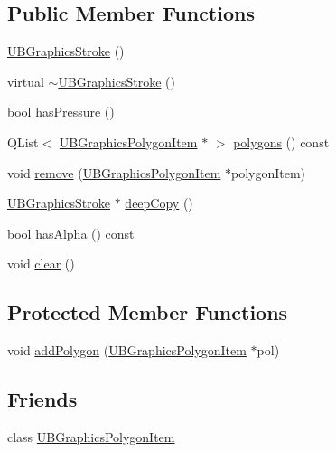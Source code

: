 \subsection*{Public Member Functions}
\begin{DoxyCompactItemize}
\item 
\hyperlink{class_u_b_graphics_stroke_a6b553a3cafb85f50607229b5430f9316}{U\-B\-Graphics\-Stroke} ()
\item 
virtual \hyperlink{class_u_b_graphics_stroke_a257f5699f73d7a5fdc6a92ae0bea4071}{$\sim$\-U\-B\-Graphics\-Stroke} ()
\item 
bool \hyperlink{class_u_b_graphics_stroke_a391767e8456dbee54956d48709dccf70}{has\-Pressure} ()
\item 
Q\-List$<$ \hyperlink{class_u_b_graphics_polygon_item}{U\-B\-Graphics\-Polygon\-Item} $\ast$ $>$ \hyperlink{class_u_b_graphics_stroke_a19d0be99f5ef2ac596e13ef018ec1d77}{polygons} () const 
\item 
void \hyperlink{class_u_b_graphics_stroke_aeecdbfc012ba82636e96ffe0d9d13846}{remove} (\hyperlink{class_u_b_graphics_polygon_item}{U\-B\-Graphics\-Polygon\-Item} $\ast$polygon\-Item)
\item 
\hyperlink{class_u_b_graphics_stroke}{U\-B\-Graphics\-Stroke} $\ast$ \hyperlink{class_u_b_graphics_stroke_adf2fb7f966fc2565bc4f37e67f8d93e7}{deep\-Copy} ()
\item 
bool \hyperlink{class_u_b_graphics_stroke_ab428c04960df5879645e0f36ddae265b}{has\-Alpha} () const 
\item 
void \hyperlink{class_u_b_graphics_stroke_a04f3372bd06e1dc691bab2bac738ff89}{clear} ()
\end{DoxyCompactItemize}
\subsection*{Protected Member Functions}
\begin{DoxyCompactItemize}
\item 
void \hyperlink{class_u_b_graphics_stroke_a76ff6a3c17efa506459591785d749f47}{add\-Polygon} (\hyperlink{class_u_b_graphics_polygon_item}{U\-B\-Graphics\-Polygon\-Item} $\ast$pol)
\end{DoxyCompactItemize}
\subsection*{Friends}
\begin{DoxyCompactItemize}
\item 
class \hyperlink{class_u_b_graphics_stroke_aec6ebbda09c500f9f324b3881394977b}{U\-B\-Graphics\-Polygon\-Item}
\end{DoxyCompactItemize}


